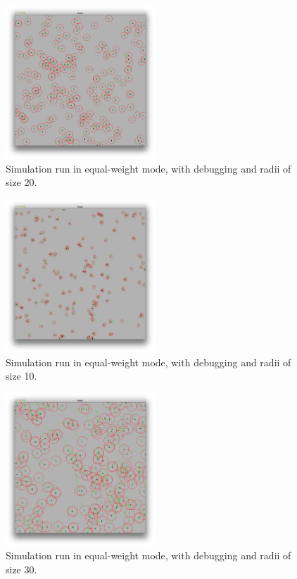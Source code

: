     \begin{figure}
        \centering
        \includegraphics[width=0.5\textwidth]{assets/img/eqweight}
        \caption{Simulation run in equal-weight mode, with debugging and radii of size 20.}
        \label{fig:eqweight}
    \end{figure}
    
    \begin{figure}
        \centering
        \includegraphics[width=0.5\textwidth]{assets/img/eqweight-small}
        \caption{Simulation run in equal-weight mode, with debugging and radii of size 10.}
        \label{fig:eqweight-small}
    \end{figure}
    
    \begin{figure}
        \centering
        \includegraphics[width=0.5\textwidth]{assets/img/eqweight-large}
        \caption{Simulation run in equal-weight mode, with debugging and radii of size 30.}
        \label{fig:eqweight-large}
    \end{figure}
    
